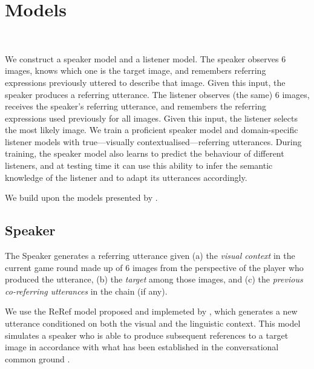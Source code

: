 
\section{Models}
\label{sec:models}

\\


We construct a speaker model and a listener model. The speaker observes 6 images, knows which one is the target image, and remembers referring expressions previously uttered to describe that image. Given this input, the speaker produces a referring utterance. The listener observes (the same) 6 images, receives the speaker's referring utterance, and remembers the referring expressions used previously for all images. Given this input, the listener selects the most likely image.
We train a proficient speaker model and domain-specific listener models with true---visually contextualised---referring utterances. During training, the speaker model also learns to predict the behaviour of different listeners, and at testing time it can use this ability to infer the semantic knowledge of the listener and to adapt its utterances accordingly. 


We build upon the models presented by \citet{takmaz-etal-2020-refer}. 

\subsection{Speaker}
\label{sec:speaker}

The Speaker generates a referring utterance given (a) the \emph{visual context} in the current game round made up of $6$ images from the perspective of the player who produced the utterance, (b) the \emph{target} among those images, and (c) the \emph{previous co-referring utterances} in the chain (if any). 


We use the ReRef model proposed and implemeted by \citet{takmaz-etal-2020-refer}, which generates a new utterance conditioned on both the visual and the linguistic context. This model simulates a speaker who is able to produce subsequent references to a target image in accordance with what has been established in the conversational common ground \cite{Clark1996,BrennanClark1996}.  

